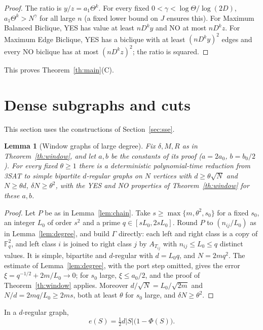 \documentclass[11pt,letterpaper]{article}
\newtheorem{lemma}[theorem]{Lemma}
\theoremstyle{definition}
\theoremstyle{remark}
\newcommand{\F}{\mathbb F}
\begin{document}
\begin{proof}
The ratio is \(y/z=a_1\Theta^k\). For every fixed \(0<\gamma<\log\Theta/
\log(2D)\), \(a_1\Theta^k>N^\gamma\) for all large \(n\) (a fixed lower bound
on \(J\) ensures this). For Maximum Balanced Biclique, YES has value at least
\(nD^ky\) and NO at most \(nD^kz\). For Maximum Edge Biclique, YES has a
biclique with at least \((nD^ky)^2\) edges and every NO biclique has at most
\((nD^kz)^2\); the ratio is squared.
\end{proof}

This proves Theorem~\ref{th:main}(C).

\section{Dense subgraphs and cuts}\label{sec:dense}

This section uses the constructions of Section~\ref{sec:sse}.

\begin{lemma}[Window graphs of large degree]\label{lem:largedeg}
Fix \(\delta,M,R\) as in Theorem~\ref{th:window}, and let \(a,b\) be the
constants of its proof (\(a=2a_0\), \(b=b_0/2\)). For every fixed
\(\theta\ge1\) there is a deterministic polynomial-time reduction from 3SAT
to simple bipartite \(d\)-regular graphs on \(N\) vertices with
\(d\ge\theta\sqrt N\) and \(N\ge\theta d\), \(\delta N\ge\theta^2\), with the
YES and NO properties of Theorem~\ref{th:window} for these \(a,b\).
\end{lemma}

\begin{proof}
Let \(P\) be as in Lemma~\ref{lem:chain}. Take \(s\ge\max\{m,\theta^2,s_0\}\)
for a fixed \(s_0\), an integer \(L_0\) of order \(s^2\) and a prime
\(q\in[sL_0,2sL_0]\). Round \(P\) to \((n_{ij}/L_0)\) as in
Lemma~\ref{lem:degree}, and build \(\Gamma\) directly: each left and right
class is a copy of \(\F_q^2\), and left class \(i\) is joined to right class
\(j\) by \(A_{T_{ij}}\) with \(n_{ij}\le L_0\le q\) distinct values. It is
simple, bipartite and \(d\)-regular with \(d=L_0q\), and \(N=2mq^2\). The
estimate of Lemma~\ref{lem:degree}, with the port step omitted, gives the
error \(\xi=q^{-1/2}+2m/L_0\to0\); for \(s_0\) large, \(\xi\le a_0/2\), and
the proof of Theorem~\ref{th:window} applies. Moreover
\(d/\sqrt N=L_0/\sqrt{2m}\) and \(N/d=2mq/L_0\ge2ms\), both at least
\(\theta\) for \(s_0\) large, and \(\delta N\ge\theta^2\).
\end{proof}

In a \(d\)-regular graph,
\begin{equation}\label{eq:edges}
e(S)=\tfrac12d|S|\bigl(1-\Phi(S)\bigr).
\end{equation}
\end{document}
